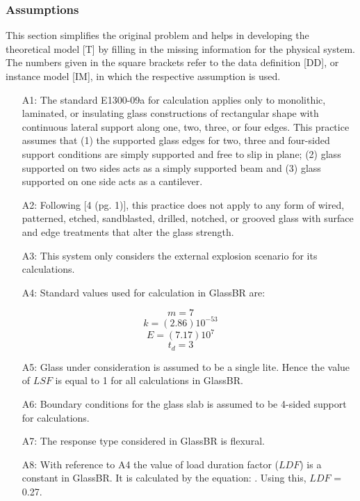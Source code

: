 \documentclass[12pt]{article}
\begin{document}
\subsubsection{Assumptions}
\label{Sec:A}
This section simplifies the original problem and helps in developing the theoretical model [T] by filling in the missing information for the physical system. The numbers given in the square brackets refer to the data definition [DD], or instance model [IM], in which the respective assumption is used.
\begin{itemize}
\item[A1:]The standard E1300-09a for calculation applies only to monolithic, laminated, or insulating glass constructions of rectangular shape with continuous lateral support along one, two, three, or four edges. This practice assumes that (1) the supported glass edges for two, three and four-sided support conditions are simply supported and free to slip in plane; (2) glass supported on two sides acts as a simply supported beam and (3) glass supported on one side acts as a cantilever.
\item[A2:]Following [4 (pg. 1)], this practice does not apply to any form of wired, patterned, etched, sandblasted, drilled, notched, or grooved glass with surface and edge treatments that alter the glass strength.
\item[A3:]This system only considers the external explosion scenario for its calculations.
\item[A4:]Standard values used for calculation in GlassBR are:
\end{itemize}
\begin{equation}
m=7
\end{equation}
\begin{equation}
k=(2.86)10^{-53}
\end{equation}
\begin{equation}
E=(7.17)10^{7}
\end{equation}
\begin{equation}
t_{d}=3
\end{equation}
\begin{itemize}
\item[A5:]Glass under consideration is assumed to be a single lite. Hence the value of $LSF$ is equal to 1 for all calculations in GlassBR.
\item[A6:]Boundary conditions for the glass slab is assumed to be 4-sided support for calculations.
\item[A7:]The response type considered in GlassBR is flexural.
\item[A8:]With reference to A4 the value of load duration factor ($LDF$) is a constant in GlassBR. It is calculated by the equation: . Using this, $LDF$ = 0.27.
\end{itemize}
\end{document}
